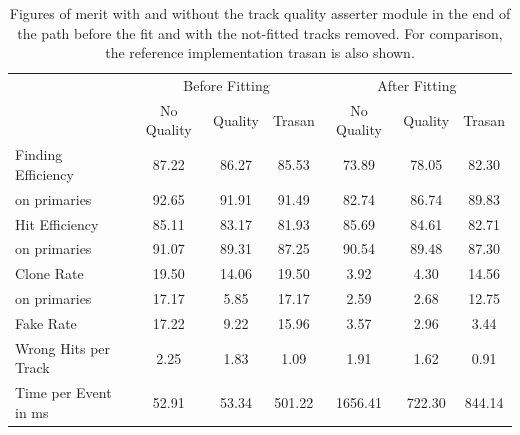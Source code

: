\begin{table}
  \caption{Figures of merit with and without the track quality asserter module in the end of the path before the fit and with the not-fitted tracks removed. For comparison, the reference implementation trasan is also shown.}
  \centering
  \begin{tabular}{lcccccc} \toprule
    & \multicolumn{3}{c}{Before Fitting} & \multicolumn{3}{c}{After Fitting} \\ 
    & No Quality & Quality & Trasan & No Quality & Quality & Trasan \\ \midrule
    Finding Efficiency   & 87.22 & 86.27 & 85.53 & 73.89  & 78.05 & 82.30 \\
    \quad on primaries   & 92.65 & 91.91 & 91.49 & 82.74  & 86.74 & 89.83 \\ 
    Hit Efficiency       & 85.11 & 83.17 & 81.93 & 85.69  & 84.61 & 82.71 \\
    \quad on primaries   & 91.07 & 89.31 & 87.25 & 90.54  & 89.48 & 87.30 \\ 
    Clone Rate           & 19.50 & 14.06 & 19.50 & 3.92   & 4.30  & 14.56 \\
    \quad on primaries   & 17.17 & 5.85  & 17.17 & 2.59   & 2.68  & 12.75 \\ 
    Fake Rate            & 17.22 & 9.22  & 15.96 & 3.57   & 2.96  & 3.44 \\ 
    Wrong Hits per Track & 2.25  & 1.83  & 1.09  & 1.91   & 1.62  & 0.91 \\
    Time per Event in ms & 52.91 & 53.34 & 501.22& 1656.41& 722.30& 844.14 \\ \bottomrule
  \end{tabular}
  
  
  \label{tab-results-after-fitting}
\end{table}


